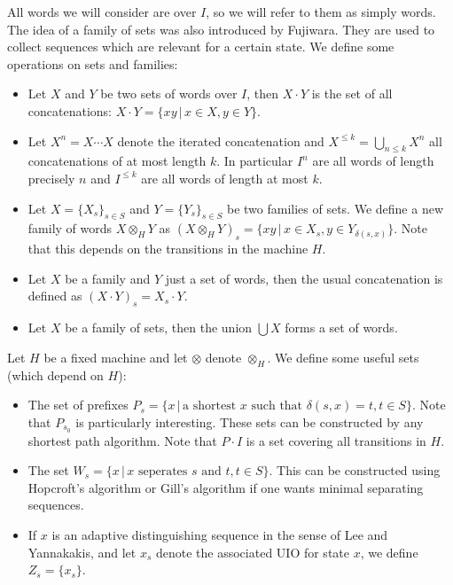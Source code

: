 \documentclass[envcountsame]{llncs}
\begin{document}
All words we will consider are over $I$, so we will refer to them as simply
words. The idea of a family of sets was also introduced by Fujiwara. They are
used to collect sequences which are relevant for a certain state. We define
some operations on sets and families:
\newcommand{\tensor}{\otimes}
\begin{itemize}
	\item Let $X$ and $Y$ be two sets of words over $I$, then $X \cdot Y$ is the
	set of all concatenations: $X \cdot Y = \{ x y \,|\, x \in X, y \in Y \}$.
	\item Let $X^n = X \cdots X$ denote the iterated concatenation and $X^{\leq k}
	= \bigcup_{n \leq k} X^n$ all concatenations of at most length $k$.
	In particular $I^n$ are all words of length
	precisely $n$ and $I^{\leq k}$ are all words of length at most $k$.
	\item Let $X = \{ X_s \}_{s \in S}$ and $Y = \{ Y_s \}_{s \in S}$ be two
	families of sets. We define a new family of	words $X \tensor_H Y$ as
	$(X \tensor_H Y)_s = \{ x y \,|\, x \in X_s, y \in Y_{\delta(s, x)} \}$.
	Note that this depends on the transitions in the machine $H$.
	\item Let $X$ be a family and $Y$ just a set of words,
	then the usual concatenation is defined as $(X \cdot Y)_s = X_s \cdot Y$.
	\item Let $X$ be a family of sets, then the union $\bigcup X$ forms a set
	of words.
\end{itemize}

Let $H$ be a fixed machine and let $\tensor$ denote $\tensor_H$. We define some
useful sets (which depend on $H$):
\begin{itemize}
	\item The set of prefixes $P_s = \{ x \,|\, \text{a shortest } x \text{ such
	that } \delta(s, x) = t, t \in S \}$. Note that $P_{s_0}$ is particularly
	interesting. These sets can be constructed by any shortest path algorithm.
	Note that $P \cdot I$ is a set covering all transitions in $H$.
	\item The set $W_s = \{ x \,|\, x \text{ seperates } s \text{ and } t, t \in
	S\}$. This can be constructed using Hopcroft's algorithm or Gill's algorithm
	if one wants minimal separating sequences.
	\item If $x$ is an adaptive distinguishing sequence in the sense of Lee and
	Yannakakis, and let $x_s$ denote the associated UIO for state $x$, we
	define $Z_s = \{ x_s \}$.
\end{itemize}
\end{document}
